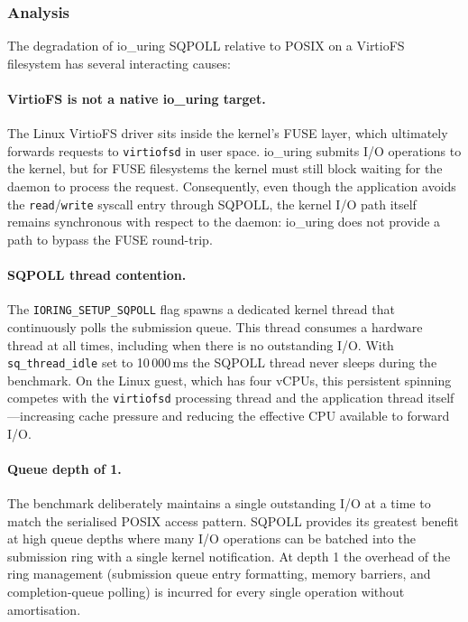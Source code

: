 \subsubsection{Analysis}

The degradation of io\_uring SQPOLL relative to POSIX on a VirtioFS
filesystem has several interacting causes:

\paragraph{VirtioFS is not a native io\_uring target.}  The Linux
VirtioFS driver sits inside the kernel's FUSE layer, which ultimately
forwards requests to \texttt{virtiofsd} in user space.  io\_uring
submits I/O operations to the kernel, but for FUSE filesystems the kernel
must still block waiting for the daemon to process the request.
Consequently, even though the application avoids the \texttt{read}/\texttt{write}
syscall entry through SQPOLL, the kernel I/O path itself remains
synchronous with respect to the daemon: io\_uring does not provide a
path to bypass the FUSE round-trip.

\paragraph{SQPOLL thread contention.}  The \texttt{IORING\_SETUP\_SQPOLL}
flag spawns a dedicated kernel thread that continuously polls the
submission queue.  This thread consumes a hardware thread at all times,
including when there is no outstanding I/O.  With \texttt{sq\_thread\_idle}
set to 10\,000\,ms the SQPOLL thread never sleeps during the benchmark.
On the Linux guest, which has four vCPUs, this persistent spinning
competes with the \texttt{virtiofsd} processing thread and the
application thread itself—increasing cache pressure and reducing the
effective CPU available to forward I/O.

\paragraph{Queue depth of 1.}  The benchmark deliberately maintains a
single outstanding I/O at a time to match the serialised POSIX access
pattern.  SQPOLL provides its greatest benefit at high queue depths where
many I/O operations can be batched into the submission ring with a single
kernel notification.  At depth 1 the overhead of the ring management
(submission queue entry formatting, memory barriers, and completion-queue
polling) is incurred for every single operation without amortisation.

